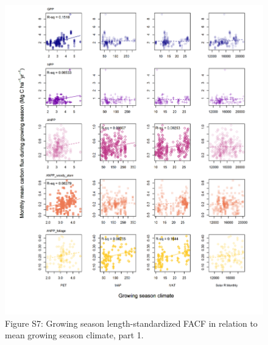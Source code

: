 \documentclass[]{article}
\begin{document}
\begin{figure}[H]
\includegraphics[width=1\linewidth]{tables_figures/gridded_growing_season1} \caption{Figure S7: Growing season length-standardized FACF in relation to mean growing season climate, part 1.}\label{fig:unnamed-chunk-13}
\end{figure}

\newpage
\end{document}

